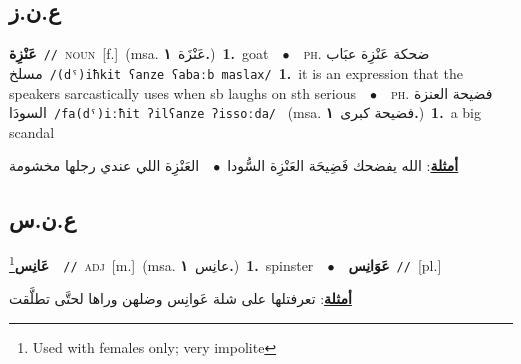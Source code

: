 \documentclass[10pt,a4paper,twoside]{article} %
\begin{document}
\begin{multicols}{2}
\vspace{-3mm}
\subsection*{\color{blue}\foreignlanguage{arabic}{ع.ن.ز}\color{blue}{}} 

{\setlength\topsep{0pt}\textbf{\foreignlanguage{arabic}{عَنْزِة}}\ {\color{gray}\texttt{//}\color{black}}\ \textsc{noun}\ [f.]\ \color{gray}(msa. \foreignlanguage{arabic}{عَنْزَة}~\foreignlanguage{arabic}{\textbf{١.}})\color{black}\ \textbf{1.}~goat\ \ $\bullet$\ \ \textsc{ph.} \color{gray} \foreignlanguage{arabic}{ضحكة عَنْزِة عبَاب مسلخ}\color{black}\ {\color{gray}\texttt{/{\sffamily (dˤ)iħkit ʕanze ʕabaːb maslax}/}\color{black}}\ \textbf{1.}~it is an expression that the speakers sarcastically uses when sb laughs on sth serious\ \ $\bullet$\ \ \textsc{ph.} \color{gray} \foreignlanguage{arabic}{فضيحة العنزة السودَا}\color{black}\ {\color{gray}\texttt{/{\sffamily fa(dˤ)iːħit ʔilʕanze ʔissoːda}/}\color{black}}\ \color{gray} (msa. \foreignlanguage{arabic}{فضيحة كبرى}~\foreignlanguage{arabic}{\textbf{١.}})\color{black}\ \textbf{1.}~a big scandal\  \begin{flushright}\color{gray}\foreignlanguage{arabic}{\textbf{\underline{\foreignlanguage{arabic}{أمثلة}}}: الله يفضحك فَضِيحَة العَنْزِة السُّودا\ $\bullet$\ \  العَنْزِة اللي عندي رجلها مخشومة}\end{flushright}\color{black}} \vspace{2mm}

\vspace{-3mm}
\subsection*{\color{blue}\foreignlanguage{arabic}{ع.ن.س}\color{blue}{}} 

{\setlength\topsep{0pt}\textbf{\foreignlanguage{arabic}{عَانِس}}\footnote{Used with females only; very impolite}\ \ {\color{gray}\texttt{//}\color{black}}\ \textsc{adj}\ [m.]\ \color{gray}(msa. \foreignlanguage{arabic}{عانِس}~\foreignlanguage{arabic}{\textbf{١.}})\color{black}\ \textbf{1.}~spinster\ \ $\bullet$\ \ \setlength\topsep{0pt}\textbf{\foreignlanguage{arabic}{عَوَانِس}}\ {\color{gray}\texttt{//}\color{black}}\ [pl.]\  \begin{flushright}\color{gray}\foreignlanguage{arabic}{\textbf{\underline{\foreignlanguage{arabic}{أمثلة}}}: تعرفتلها على شلة عَوانِس وضلهن وراها لحتَّى تطلَّقت}\end{flushright}\color{black}} \vspace{2mm}


\end{multicols}
\end{document}
